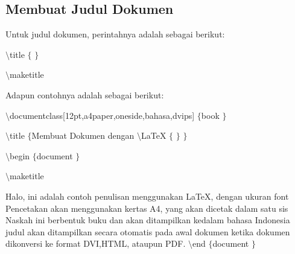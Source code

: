 \subsection{Membuat Judul Dokumen}
 \par
Untuk judul dokumen, perintahnya adalah sebagai berikut:
 \par
{\fontsize{10pt}{10pt}\selectfont  $  \setminus  $title $  \{  $ $  \}  $}
 \par
{\fontsize{10pt}{10pt}\selectfont  $  \setminus  $maketitle}
 \par
\vspace{12pt}
Adapun contohnya adalah sebagai berikut:
 \par
{\fontsize{10pt}{10pt}\selectfont  $  \setminus  $documentclass[12pt,a4paper,oneside,bahasa,dvips] $  \{  $book $  \}  $}
 \par
{\fontsize{10pt}{10pt}\selectfont  $  \setminus  $title $  \{  $Membuat Dokumen dengan  $  \setminus  $LaTeX $  \{  $ $  \}  $ $  \}  $}
 \par
{\fontsize{10pt}{10pt}\selectfont  $  \setminus  $begin $  \{  $document $  \}  $}
 \par
{\fontsize{10pt}{10pt}\selectfont  $  \setminus  $maketitle}
 \par
\vspace{10pt}
{\fontsize{10pt}{10pt}\selectfont Halo, ini adalah contoh penulisan menggunakan LaTeX, dengan ukuran font Pencetakan akan menggunakan kertas A4, yang akan dicetak dalam satu sis Naskah ini berbentuk buku dan akan ditampilkan kedalam bahasa Indonesia judul akan ditampilkan secara otomatis pada awal dokumen ketika dokumen dikonversi ke format DVI,HTML, ataupun PDF.  $  \setminus  $end $  \{  $document $  \}  $} 

